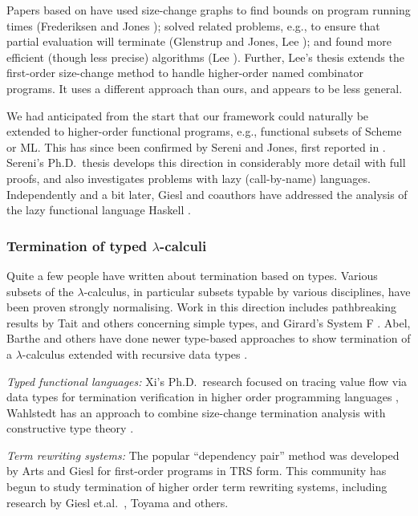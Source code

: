\documentclass{LMCS}
\theoremstyle{definition}\newtheorem{env}[thm]{Environment}
\begin{document}
Papers based on \cite{popl01} have used size-change graphs to 
find bounds on program running times 
(Frederiksen and Jones \cite{frederiksen-jones}); solved related problems, e.g., to ensure that 
partial evaluation will
terminate  (Glenstrup and Jones, Lee \cite{glenstrup-jones,lee-ptime-bta}); and
found more efficient (though less precise)
algorithms (Lee \cite{lee-poly-time-analysis}).
Further, Lee's thesis  \cite{lee-thesis} extends the first-order size-change method  
\cite{popl01} to handle higher-order named combinator programs.
It uses a different approach than ours, and appears to be less general.

We had anticipated from the start that our framework could
naturally be extended to higher-order functional programs, 
e.g., functional subsets of Scheme or ML. This has since been 
confirmed by Sereni and Jones, first reported in  \cite{serenijones}.
Sereni's Ph.D.\ thesis  \cite{sereni} develops this direction in considerably more detail
with full proofs, and also investigates problems with lazy (call-by-name) languages. 
Independently and a bit later, Giesl and coauthors have addressed the analysis of 
the lazy functional language Haskell \cite{haskell}.




\subsubsection*{Termination of typed $\lambda$-calculi} 

Quite a few people have written  about termination based on types. 
Various subsets of the
$\lambda$-calculus, in particular subsets typable by various 
disciplines,  have been proven
strongly normalising. 
Work in this direction includes 
pathbreaking results by Tait  \cite{tait} and others
concerning simple types,
and
Girard's System F  \cite{girard}.
Abel, Barthe and others have done newer type-based approaches to show termination
of a $\lambda$-calculus extended with recursive data types \cite{abel,abelthesis,barthe}. 



{\em Typed functional languages:}
Xi's Ph.D.\ research focused on tracing value flow via data types
for termination verification 
in higher order programming languages  \cite{xi}, 
Wahlstedt has an approach to combine size-change termination 
analysis with constructive type theory
\cite{wahlstedt, wahlstedt1}. 



{\em Term rewriting systems:}
The popular ``dependency pair'' method was developed
 by Arts  and Giesl \cite{giesl-arts} for first-order programs in TRS form.
This community has begun to study termination  of
higher order 
term rewriting systems, including research by 
Giesl et.al.\ \cite{giesl-thiemann,haskell},
Toyama \cite{toyama} and others.
\end{document}
